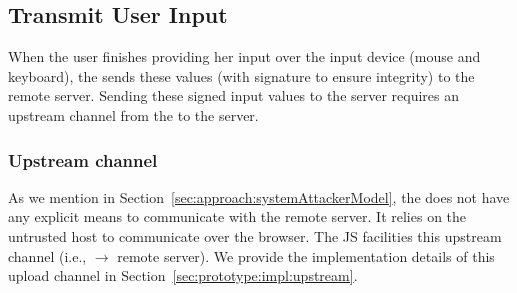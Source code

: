  

\subsection{Transmit User Input}
\label{sec:systemDesign:commit}

When the user finishes providing her input over the input device (mouse and keyboard), the \device sends these values (with signature to ensure integrity) to the remote server. Sending these signed input values to the server requires an upstream channel from the \device to the server.

\subsubsection{\bfseries Upstream channel}\label{sec:systemDesign:commit:upload} As we mention in Section~\ref{sec:approach:systemAttackerModel}, the \device does not have any explicit means to communicate with the remote server. It relies on the untrusted host to communicate over the browser. The \name JS facilities this upstream channel (i.e., \device $\rightarrow$ remote server). We provide the implementation details of this upload channel in Section~\ref{sec:prototype:impl:upstream}.
 

